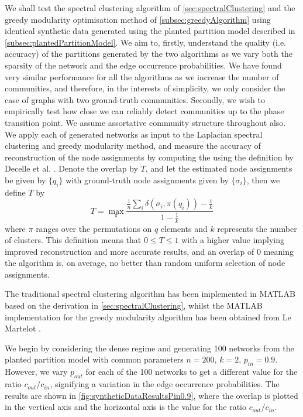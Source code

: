 We shall test the spectral clustering algorithm of \cref{sec:spectralClustering} and the greedy modularity optimisation method of \cref{subsec:greedyAlgorithm} using identical synthetic data generated using the planted partition model described in \cref{subsec:plantedPartitionModel}.
We aim to, firstly, understand the quality (i.e. accuracy) of the partitions generated by the two algorithms as we vary both the sparsity of the network and the edge occurrence probabilities.
We have found very similar performance for all the algorithms as we increase the number of communities, and therefore, in the interests of simplicity, we only consider the case of graphs with two ground-truth communities.
Secondly, we wish to empirically test how close we can reliably detect communities up to the phase transition point.
We assume assortative community structure throughout also.
We apply each of generated networks as input to the Laplacian spectral clustering and greedy modularity method, and measure the accuracy of reconstruction of the node assignments by computing the  using the definition by Decelle et al. \cite{DKM+11,DKM+13}.
Denote the overlap by $T$, and let the estimated node assignments be given by $\{q_{i}\}$ with ground-truth node assignments given by $\{\sigma_{i}\}$, then we define $T$ by
\begin{equation}
	\label{eq:overlap}
	T = \max_{\pi} \frac{\frac{1}{n} \sum_{i} \delta(\sigma_{i},\pi(q_{i})) - \frac{1}{k}}{1 - \frac{1}{k}}
\end{equation}
where $\pi$ ranges over the permutations on $q$ elements and $k$ represents the number of clusters.
This definition means that $0 \le T \le 1$ with a higher value implying improved reconstruction and more accurate results, and an overlap of 0 meaning the algorithm is, on average, no better than random uniform selection of node assignments.

The traditional spectral clustering algorithm  has been implemented in MATLAB based on the derivation in \cref{sec:spectralClustering}, whilst the MATLAB implementation for the greedy modularity algorithm has been obtained from Le Martelot \cite{ELM}.

We begin by considering the dense regime and generating 100 networks from the planted partition model with common parameters $n=200$, $k=2$, $p_{in}=0.9$.
However, we vary $p_{out}$ for each of the 100 networks to get a different value for the ratio $c_{out}/c_{in}$, signifying a variation in the edge occurrence probabilities.
The results are shown in \cref{fig:syntheticDataResultsPin0.9}, where the overlap is plotted in the vertical axis and the horizontal axis is the value for the ratio $c_{out}/c_{in}$.

